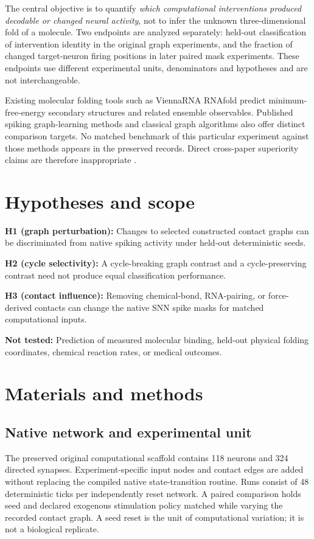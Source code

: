 \documentclass[10pt,a4paper]{article}
\begin{document}
The central objective is to quantify \emph{which computational interventions produced decodable or changed neural activity}, not to infer the unknown three-dimensional fold of a molecule. Two endpoints are analyzed separately: held-out classification of intervention identity in the original graph experiments, and the fraction of changed target-neuron firing positions in later paired mask experiments. These endpoints use different experimental units, denominators and hypotheses and are not interchangeable.

Existing molecular folding tools such as ViennaRNA RNAfold predict minimum-free-energy secondary structures and related ensemble observables. Published spiking graph-learning methods and classical graph algorithms also offer distinct comparison targets. No matched benchmark of this particular experiment against those methods appears in the preserved records. Direct cross-paper superiority claims are therefore inappropriate \cite{ViennaRNA,MethodsPolicies}.

\section{Hypotheses and scope}
\textbf{H1 (graph perturbation):} Changes to selected constructed contact graphs can be discriminated from native spiking activity under held-out deterministic seeds.\par
\textbf{H2 (cycle selectivity):} A cycle-breaking graph contrast and a cycle-preserving contrast need not produce equal classification performance.\par
\textbf{H3 (contact influence):} Removing chemical-bond, RNA-pairing, or force-derived contacts can change the native SNN spike masks for matched computational inputs.\par
\textbf{Not tested:} Prediction of measured molecular binding, held-out physical folding coordinates, chemical reaction rates, or medical outcomes.

\section{Materials and methods}
\subsection{Native network and experimental unit}
The preserved original computational scaffold contains 118 neurons and 324 directed synapses. Experiment-specific input nodes and contact edges are added without replacing the compiled native state-transition routine. Runs consist of 48 deterministic ticks per independently reset network. A paired comparison holds seed and declared exogenous stimulation policy matched while varying the recorded contact graph. A seed reset is the unit of computational variation; it is not a biological replicate.
\end{document}
